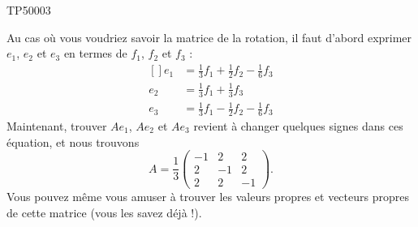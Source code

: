 \begin{corrige}{TP50003}
\begin{enumerate}
			Au cas où vous voudriez savoir la matrice de la rotation, il faut d'abord exprimer $e_1$, $e_2$ et $e_3$ en termes de $f_1$, $f_2$ et $f_3$ :
			\begin{equation}
				\begin{aligned}[]
					e_1&=\frac{1}{ 3 }f_1+\frac{1}{ 2 }f_2-\frac{1}{ 6 }f_3\\
					e_2&=\frac{1}{ 3 }f_1+\frac{1}{ 3 }f_3\\
					e_3&=\frac{1}{ 3 }f_1-\frac{1}{ 2 }f_2-\frac{1}{ 6 }f_3
				\end{aligned}
			\end{equation}
			Maintenant, trouver $Ae_1$, $Ae_2$ et $Ae_3$ revient à changer quelques signes dans ces équation, et nous trouvons
			\begin{equation}
				A=\frac{1}{ 3 }\begin{pmatrix}
					-1	&	2	&	2	\\
					2	&	-1	&	2	\\
					2	&	2	&	-1
				\end{pmatrix}.
			\end{equation}
			Vous pouvez même vous amuser à trouver les valeurs propres et vecteurs propres de cette matrice (vous les savez déjà !).


\end{enumerate}
\end{corrige}
